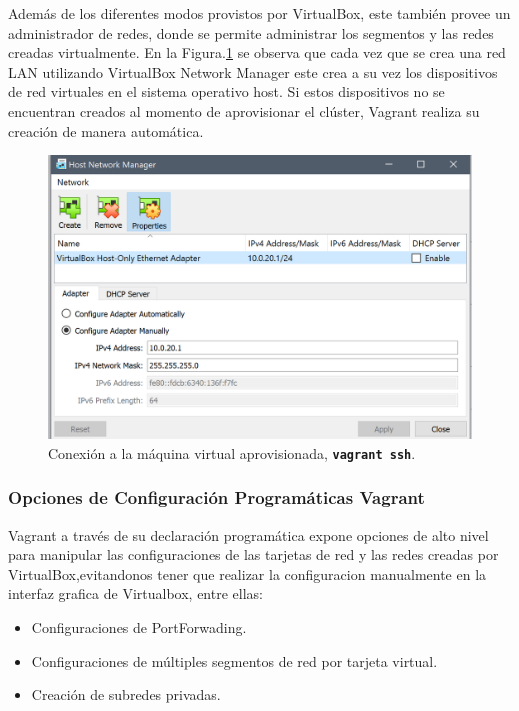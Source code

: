 \documentclass[letterpaper, 12pt, oneside]{article}
\begin{document}
   Además de los diferentes modos provistos por VirtualBox, este también provee un administrador de redes, donde se permite administrar los segmentos y las redes creadas virtualmente. En la Figura.\ref{fig:net2} se observa que cada vez que se crea una red LAN utilizando VirtualBox Network Manager este crea a su vez los dispositivos de red virtuales en el sistema operativo host. Si estos dispositivos no se encuentran creados al momento de aprovisionar el clúster, Vagrant realiza su creación de manera automática.
    
    \begin{figure}[H]
        \includegraphics[scale=1]{img/networking/networking2.png}
        \caption{Conexión a la máquina virtual aprovisionada, \textbf{\texttt{vagrant ssh}}.}
        \label{fig:net2}
    \end{figure}
    \subsubsection{Opciones de Configuración Programáticas Vagrant}
    Vagrant a través de su declaración programática expone opciones de alto nivel para manipular las configuraciones de las tarjetas de red y las redes creadas por VirtualBox,evitandonos tener que realizar la configuracion manualmente en la interfaz grafica de Virtualbox,  entre ellas: 
    \begin{itemize}
        \item Configuraciones de PortForwading.
        \item Configuraciones de múltiples segmentos de red por tarjeta virtual.
        \item Creación de subredes privadas.
    \end{itemize}
    
\end{document}
